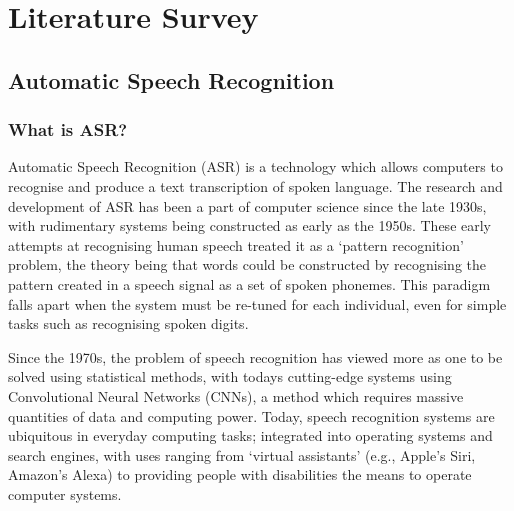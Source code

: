 \chapter{Literature Survey}\label{ch:literature-survey}

\section{Automatic Speech Recognition}\label{sec:what-is-asr}

\subsection{What is ASR?}

Automatic Speech Recognition (ASR) is a technology which allows computers to recognise and produce a text transcription of spoken language.
The research and development of ASR has been a part of computer science since the late 1930s\cite{Rabiner2004Jan,vocoder}, with rudimentary systems being constructed as early as the 1950s\cite{asr-52}.
These early attempts at recognising human speech treated it as a `pattern recognition' problem, the theory being that words could be constructed by recognising the pattern created in a speech signal as a set of spoken phonemes\cite{Rabiner2004Jan}. 
This paradigm falls apart when the system must be re-tuned for each individual, even for simple tasks such as recognising spoken digits\cite{asr-52}.

Since the 1970s, the problem of speech recognition has viewed more as one to be solved using statistical methods\cite{early-asr,Rabiner2004Jan,LevinsonS.E.1983Aitt}, with todays cutting-edge systems using Convolutional Neural Networks (CNNs)\cite{whisper,wav2vec2,bigssl,chung2021}, a method which requires massive quantities of data and computing power.
Today, speech recognition systems are ubiquitous in everyday computing tasks; 
integrated into operating systems and search engines, with uses ranging from `virtual assistants' (e.g., Apple's Siri, Amazon's Alexa) to providing people with disabilities the means to operate computer systems.

